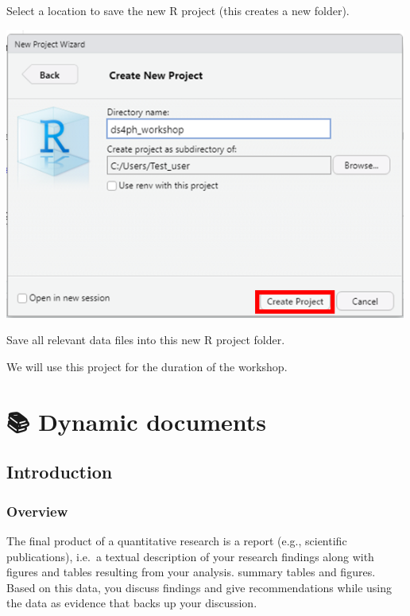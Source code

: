 \documentclass[
  letterpaper,
  DIV=11,
  numbers=noendperiod,
  oneside]{scrreprt}
\begin{document}
Select a location to save the new R project (this creates a new folder).

\includegraphics[width=5.20833in,height=\textheight]{images/paste-C05F97BD.png}

Save all relevant data files into this new R project folder.

We will use this project for the duration of the workshop.

\hypertarget{dynamic-documents}{%
\chapter{\texorpdfstring{{📚} Dynamic
documents}{📚 Dynamic documents}}\label{dynamic-documents}}

\hypertarget{introduction-5}{%
\section{Introduction}\label{introduction-5}}

\hypertarget{overview-3}{%
\subsection{Overview}\label{overview-3}}

The final product of a quantitative research is a report (e.g.,
scientific publications), i.e.~a textual description of your research
findings along with figures and tables resulting from your analysis.
summary tables and figures. Based on this data, you discuss findings and
give recommendations while using the data as evidence that backs up your
discussion.
\end{document}
